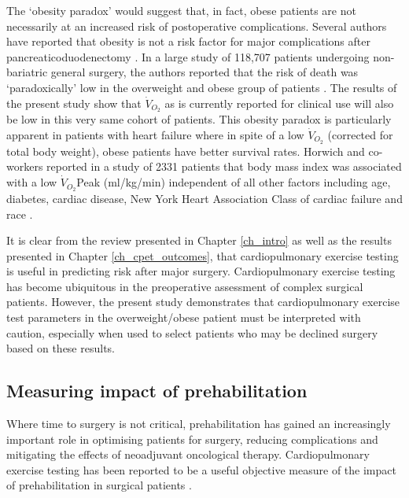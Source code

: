 The `obesity paradox' would suggest that, in fact, obese patients are not necessarily at an increased risk of postoperative complications. 
Several authors have reported that obesity is not a risk factor for major complications after pancreaticoduodenectomy \parencite{khan_does_2010, tsai_impact_2010, balentine_obesity_2011}. 
In a large study of 118,707 patients undergoing non-bariatric general surgery, the authors reported that the risk of death was `paradoxically' low in the overweight and obese group of patients \parencite{mullen_obesity_2009}. 
The results of the present study show that $\dot{V}_{O_2}$ as is currently reported for clinical use will also be low in this very same cohort of patients. 
This obesity paradox is particularly apparent in patients with heart failure where in spite of a low $\dot{V}_{O_2}$ (corrected for total body weight), obese patients have better survival rates. 
Horwich and co-workers reported in a study of 2331 patients that body mass index was associated with a low $\dot{V}_{O_2}$Peak (ml/kg/min) independent of all other factors including age, diabetes, cardiac disease, New York Heart Association Class of cardiac failure and race \parencite{horwich_relationship_2009}.

It is clear from the review presented in Chapter \ref{ch_intro} as well as the results presented in Chapter \ref{ch_cpet_outcomes}, that cardiopulmonary exercise testing is useful in predicting risk after major surgery. 
Cardiopulmonary exercise testing has become ubiquitous in the preoperative assessment of complex surgical patients. 
However, the present study demonstrates that cardiopulmonary exercise test parameters in the overweight/obese patient must be interpreted with caution, especially when used to select patients who may be declined surgery based on these results. 

\subsection{Measuring impact of prehabilitation}

Where time to surgery is not critical, prehabilitation has gained an increasingly important role in optimising patients for surgery, reducing complications \parencite{jones_effects_2007, dronkers_preoperative_2010, valkenet_effects_2010, gillis_prehabilitation_2014} and mitigating the effects of neoadjuvant oncological therapy\parencite{west_effect_2015}.
Cardiopulmonary exercise testing has been reported to be a useful objective measure of the impact of prehabilitation in surgical patients \parencite{west_effect_2015}.

